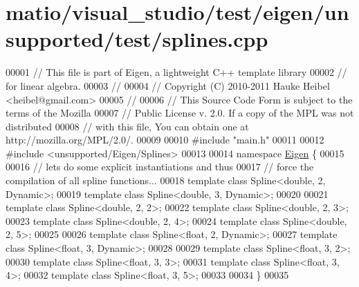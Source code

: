 \hypertarget{matio_2visual__studio_2test_2eigen_2unsupported_2test_2splines_8cpp_source}{}\section{matio/visual\+\_\+studio/test/eigen/unsupported/test/splines.cpp}
\label{matio_2visual__studio_2test_2eigen_2unsupported_2test_2splines_8cpp_source}

\begin{DoxyCode}
00001 \textcolor{comment}{// This file is part of Eigen, a lightweight C++ template library}
00002 \textcolor{comment}{// for linear algebra.}
00003 \textcolor{comment}{//}
00004 \textcolor{comment}{// Copyright (C) 2010-2011 Hauke Heibel <heibel@gmail.com>}
00005 \textcolor{comment}{//}
00006 \textcolor{comment}{// This Source Code Form is subject to the terms of the Mozilla}
00007 \textcolor{comment}{// Public License v. 2.0. If a copy of the MPL was not distributed}
00008 \textcolor{comment}{// with this file, You can obtain one at http://mozilla.org/MPL/2.0/.}
00009 
00010 \textcolor{preprocessor}{#include "main.h"}
00011 
00012 \textcolor{preprocessor}{#include <unsupported/Eigen/Splines>}
00013 
00014 \textcolor{keyword}{namespace }\hyperlink{namespace_eigen}{Eigen} \{
00015   
00016   \textcolor{comment}{// lets do some explicit instantiations and thus}
00017   \textcolor{comment}{// force the compilation of all spline functions...}
00018   \textcolor{keyword}{template} \textcolor{keyword}{class }Spline<double, 2, Dynamic>;
00019   \textcolor{keyword}{template} \textcolor{keyword}{class }Spline<double, 3, Dynamic>;
00020 
00021   \textcolor{keyword}{template} \textcolor{keyword}{class }Spline<double, 2, 2>;
00022   \textcolor{keyword}{template} \textcolor{keyword}{class }Spline<double, 2, 3>;
00023   \textcolor{keyword}{template} \textcolor{keyword}{class }Spline<double, 2, 4>;
00024   \textcolor{keyword}{template} \textcolor{keyword}{class }Spline<double, 2, 5>;
00025 
00026   \textcolor{keyword}{template} \textcolor{keyword}{class }Spline<float, 2, Dynamic>;
00027   \textcolor{keyword}{template} \textcolor{keyword}{class }Spline<float, 3, Dynamic>;
00028 
00029   \textcolor{keyword}{template} \textcolor{keyword}{class }Spline<float, 3, 2>;
00030   \textcolor{keyword}{template} \textcolor{keyword}{class }Spline<float, 3, 3>;
00031   \textcolor{keyword}{template} \textcolor{keyword}{class }Spline<float, 3, 4>;
00032   \textcolor{keyword}{template} \textcolor{keyword}{class }Spline<float, 3, 5>;
00033 
00034 \}
00035 

\end{DoxyCode}
